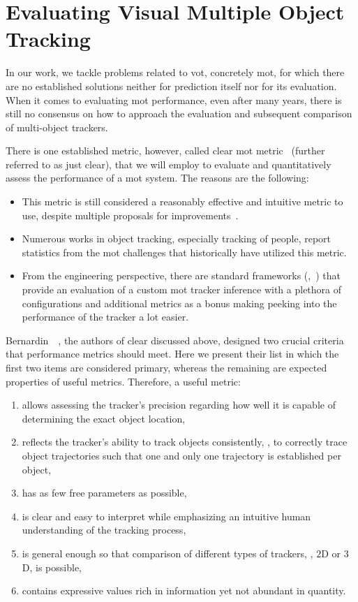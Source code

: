 \section{Evaluating Visual Multiple Object Tracking}
\label{sec:EvaluatingMOT}

In our work, we tackle problems related to \Gls{vot}, concretely \gls{mot}, for which there are no established solutions neither for prediction itself nor for its evaluation. When it comes to evaluating \gls{mot} performance, even after many years, there is still no consensus on how to approach the evaluation and subsequent comparison of multi-object trackers.

There is one established metric, however, called \gls{clear} \gls{mot} metric~\cite{bernardin2008clearmot} (further referred to as just \gls{clear}), that we will employ to evaluate and quantitatively assess the performance of a \gls{mot} system. The reasons are the following:
\begin{itemize}
    \item This metric is still considered a reasonably effective and intuitive metric to use, despite multiple proposals for improvements~\cite{wen2020uadetrac}.
    \item Numerous works in object tracking, especially tracking of people, report statistics from the \gls{mot} challenges that historically have utilized this metric.
    \item From the engineering perspective, there are standard frameworks (\egtext{},~\cite{webpymotmetrics}) that provide an evaluation of a custom \gls{mot} tracker inference with a plethora of configurations and additional metrics as a bonus making peeking into the performance of the tracker a lot easier.
\end{itemize}

Bernardin~\etal{}~\cite{bernardin2008clearmot}, the authors of \gls{clear} discussed above, designed two crucial criteria that performance metrics should meet. Here we present their list in which the first two items are considered primary, whereas the remaining are expected properties of useful metrics. Therefore, a useful metric:
\begin{enumerate}
    \item allows assessing the tracker's precision regarding how well it is capable of determining the exact object location,
    \item reflects the tracker's ability to track objects consistently, \ietext{}, to correctly trace object trajectories such that one and only one trajectory is established per object,
    \item has as few free parameters as possible,
    \item is clear and easy to interpret while emphasizing an intuitive human understanding of the tracking process,
    \item is general enough so that comparison of different types of trackers, \egtext{}, $2$D or $3$D, is possible,
    \item contains expressive values rich in information yet not abundant in quantity.
\end{enumerate}

